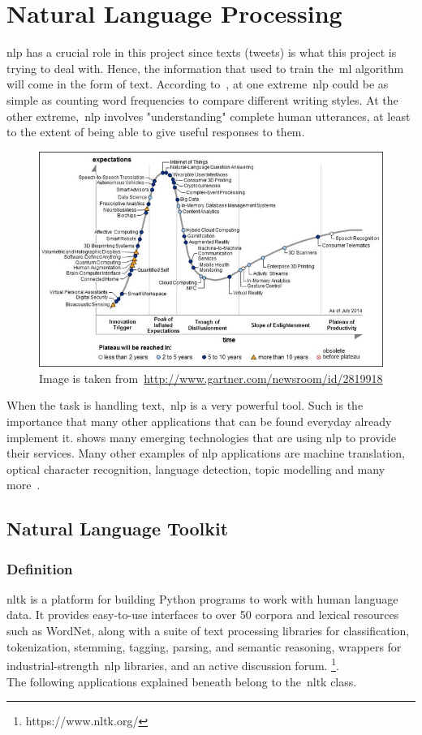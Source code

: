 \section{Natural Language Processing}
\ac{nlp} has a crucial role in this project since texts (tweets) is what this project is trying to deal with. Hence, the information that used to train the~\ac{ml} algorithm will come in the form of text. According to~\cite{bird2009natural}, at one extreme~\ac{nlp} could be as simple as counting word frequencies to compare different writing styles. At the other extreme,~\ac{nlp} involves "understanding" complete human utterances, at least to the extent of being able to give useful responses to them.\\
\begin{figure}
	\includegraphics[width=\linewidth]{img/nlp.jpg}
	\caption{Image is taken from~\url{http://www.gartner.com/newsroom/id/2819918}}
	\label{fig:nlptech}
\end{figure}
When the task is handling text,~\ac{nlp} is a very powerful tool. Such is the importance that many other applications that can be found everyday already implement it.  shows many emerging technologies that are using \ac{nlp} to provide their services.
Many other examples of \ac{nlp} applications are machine translation, optical character recognition, language detection, topic modelling and many more~\cite{stopwords}.

\label{sec:NLP}
\subsection{Natural Language Toolkit}
\subsubsection{Definition}
\ac{nltk} is a platform for building Python programs to work with human language data. It provides easy-to-use interfaces to over 50 corpora and lexical resources such as WordNet, along with a suite of text processing libraries for classification, tokenization, stemming, tagging, parsing, and semantic reasoning, wrappers for industrial-strength~\ac{nlp} libraries, and an active discussion forum. \footnote{https://www.nltk.org/}.\\
The following applications explained beneath belong to the~\ac{nltk} class.
